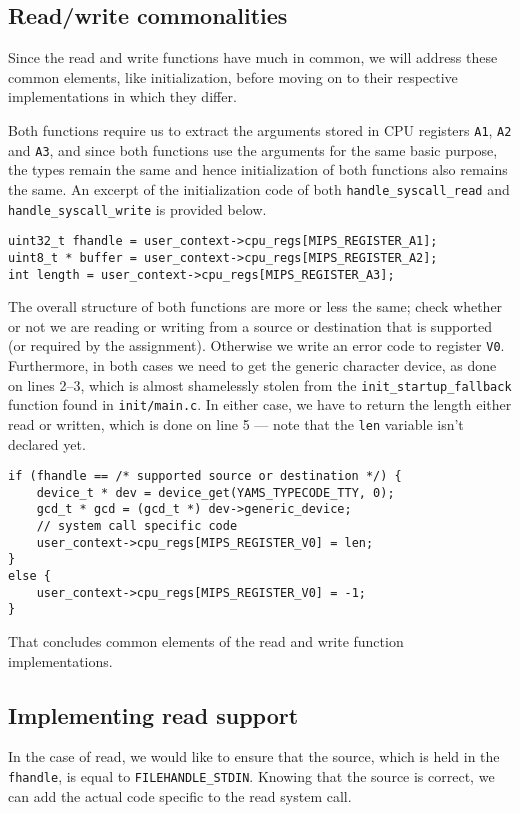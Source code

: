 \documentclass[11pt]{article}
\newcommand{\code}[1]{{\tt #1}}
\newcommand{\file}[1]{{\tt #1}}
\begin{document}
\subsection{Read/write commonalities}
Since the read and write functions have much in common, we will address these
common elements, like initialization, before moving on to their respective
implementations in which they differ.

Both functions require us to extract the arguments stored in CPU registers
\code{A1}, \code{A2} and \code{A3}, and since both functions use the arguments
for the same basic purpose, the types remain the same and hence initialization
of both functions also remains the same. An excerpt of the initialization code
of both \code{handle\_syscall\_read} and \code{handle\_syscall\_write} is
provided below.

\begin{lstlisting}
uint32_t fhandle = user_context->cpu_regs[MIPS_REGISTER_A1];
uint8_t * buffer = user_context->cpu_regs[MIPS_REGISTER_A2];
int length = user_context->cpu_regs[MIPS_REGISTER_A3];
\end{lstlisting}

The overall structure of both functions are more or less the same; check
whether or not we are reading or writing from a source or destination that is
supported (or required by the assignment). Otherwise we write an error code to
register \code{V0}. Furthermore, in both cases we need to get the generic
character device, as done on lines 2--3, which is almost shamelessly stolen
from the \code{init\_startup\_fallback} function found in \file{init/main.c}.
In either case, we have to return the length either read or written, which is
done on line 5 --- note that the \code{len} variable isn't declared yet.

\begin{lstlisting}
if (fhandle == /* supported source or destination */) {
    device_t * dev = device_get(YAMS_TYPECODE_TTY, 0);
    gcd_t * gcd = (gcd_t *) dev->generic_device;
    // system call specific code
    user_context->cpu_regs[MIPS_REGISTER_V0] = len;
}
else {
    user_context->cpu_regs[MIPS_REGISTER_V0] = -1;
}
\end{lstlisting}

That concludes common elements of the read and write function implementations.

\subsection{Implementing read support}
In the case of read, we would like to ensure that the source, which is held
in the \code{fhandle}, is equal to \code{FILEHANDLE\_STDIN}. Knowing that the
source is correct, we can add the actual code specific to the read system
call.
\end{document}
